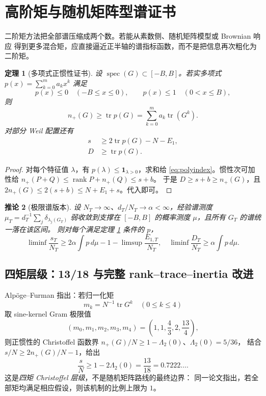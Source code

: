 \documentclass[UTF8,11pt,a4paper]{ctexart}
\newtheorem{theorem}{定理}[section]
\newtheorem{corollary}[theorem]{推论}
\theoremstyle{definition}
\theoremstyle{remark}
\newcommand{\tr}{\operatorname{tr}}
\newcommand{\rank}{\operatorname{rank}}
\newcommand{\spec}{\operatorname{spec}}
\begin{document}
\section{高阶矩与随机矩阵型谱证书}

二阶矩方法把全部谱压缩成两个数。若能从素数侧、随机矩阵模型或 Brownian 响应
得到更多混合矩，应直接逼近正半轴的谱指标函数，而不是把信息再次粗化为二阶矩。

\begin{theorem}[多项式正惯性证书]\label{thm:poly}
设 $\spec(G)\subset[-B,B]$。若实多项式
$p(x)=\sum_{k=0}^m a_kx^k$ 满足
\[
 p(x)\le0\quad(-B\le x\le0),\qquad
 p(x)\le1\quad(0<x\le B),
\]
则
\begin{equation}\label{eq:polyindex}
 n_+(G)\ge\tr p(G)=\sum_{k=0}^m a_k\tr(G^k).
\end{equation}
对部分 Weil 配置还有
\begin{align}
 s&\ge2\tr p(G)-N-E_1, \label{eq:polys}\\
 D&\ge\tr p(G). \label{eq:polyd}
\end{align}
\end{theorem}

\begin{proof}
对每个特征值 $\lambda$，有 $p(\lambda)\le\mathbf1_{\lambda>0}$，求和给
\eqref{eq:polyindex}。惯性次可加性给
$n_+(P+Q)\le\rank P+n_+(Q)\le s+b$。
于是 $D\ge s+b\ge n_+(G)$，且
$2n_+(G)\le2(s+b)\le N+E_1+s$。代入即可。
\end{proof}

\begin{corollary}[极限谱版本]
设 $N_T\to\infty$、$d_T/N_T\to\alpha<\infty$，经验谱测度 $\mu_T=d_T^{-1}\sum_j\delta_{\lambda_j(G_T)}$
弱收敛到支撑在 $[-B,B]$ 的概率测度 $\mu$，且所有 $G_T$ 的谱统一落在该区间。
则对每个满足定理 \ref{thm:poly} 条件的 $p$，
\[
 \liminf\frac{s_T}{N_T}
 \ge2\alpha\int p\,d\mu-1-\limsup\frac{E_{1,T}}{N_T},
\quad
 \liminf\frac{D_T}{N_T}\ge\alpha\int p\,d\mu.
\]
\end{corollary}

\subsection{四矩层级：13/18 与完整 rank--trace--inertia 改进}

Alpöge--Furman \cite[\S7.2(d)--(f)]{AF26} 指出：若归一化矩
\[
 m_k=N^{-1}\tr G^k\quad(0\le k\le4)
\]
取 sine-kernel Gram 极限值
\[
 (m_0,m_1,m_2,m_3,m_4)
 =\left(1,1,\frac43,2,\frac{13}{4}\right),
\]
则正惯性的 Christoffel 函数界
$n_+(G)/N\ge1-\Lambda_2(0)$、$\Lambda_2(0)=5/36$，
结合 $s/N\ge2n_+(G)/N-1$，给出
\[
 \frac{s}{N}\ge1-2\Lambda_2(0)=\frac{13}{18}=0.7222\ldots.
\]
这是\emph{四矩 Christoffel 层级}，不是随机矩阵路线的最终边界：
同一论文指出，若全部矩均满足相应假设，则该机制的比例上限为 $1$。
\end{document}

